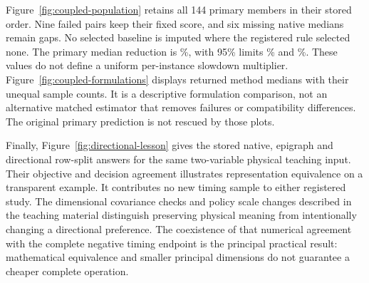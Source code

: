 Figure~\ref{fig:coupled-population} retains all 144 primary members in their
stored order. Nine failed pairs keep their fixed score, and six missing
native medians remain gaps. No selected baseline is imputed where the
registered rule selected none. The primary median reduction is
\PrimaryEstimate\%, with 95\% limits \PrimaryLower\% and \PrimaryUpper\%.
These values do not define a uniform per-instance slowdown multiplier.
Figure~\ref{fig:coupled-formulations} displays returned method medians with
their unequal sample counts. It is a descriptive formulation comparison,
not an alternative matched estimator that removes failures or compatibility
differences. The original primary prediction is not rescued by those plots.



Finally, Figure~\ref{fig:directional-lesson} gives the stored native, epigraph
and directional row-split answers for the same two-variable physical teaching
input. Their objective and decision agreement illustrates representation
equivalence on a transparent example. It contributes no new timing sample
to either registered study. The dimensional covariance checks and policy
scale changes described in the teaching material distinguish preserving
physical meaning from intentionally changing a directional preference.
The coexistence of that numerical agreement with the complete negative
timing endpoint is the principal practical result: mathematical equivalence
and smaller principal dimensions do not guarantee a cheaper complete operation.

